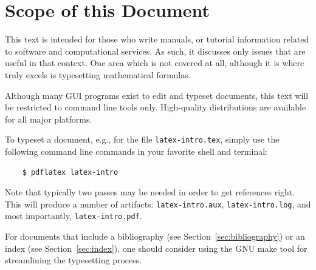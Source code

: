 \documentclass[11pt,a4paper,oneside]{book}
\begin{document}
\section{Scope of this Document}
\label{sec:scope}

This text is intended for those who write manuals, or tutorial information related to software and computational services.  As such, it discusses only issues that are useful in that context.  One area which is not covered at all, although it is where \LaTeXe{} truly excels is typesetting mathematical formulas.

Although many GUI programs exist to edit and typeset \LaTeXe{} documents, this text will be restricted to command line tools only.  High-quality distributions are available for all major platforms.

To typeset a document, e.g., for the file \verb|latex-intro.tex|, simply use the following command line commands in your favorite shell and terminal:
\begin{verbatim}
    $ pdflatex latex-intro
\end{verbatim}
Note that typically two passes may be needed in order to get references right.  This will produce a number of artifacts: \verb|latex-intro.aux|, \verb|latex-intro.log|, and most importantly, \verb|latex-intro.pdf|.

For documents that include a bibliography (see Section~\ref{sec:bibliography}) or an index (see Section~\ref{sec:index}), one should consider using the GNU make tool for streamlining the typesetting process.
\end{document}
